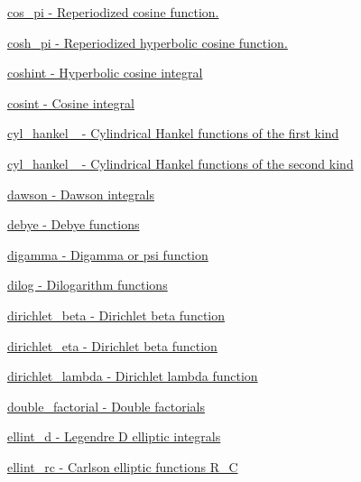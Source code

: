\begin{DoxyItemize}
\item \hyperlink{group__gnu__math__spec__func_gafc4698ae591b0e9e61285b0794d43ef4}{cos\+\_\+pi -\/ Reperiodized cosine function.}
\item \hyperlink{group__gnu__math__spec__func_gaf59c68a01adfdab0f22c4fb405ab2a36}{cosh\+\_\+pi -\/ Reperiodized hyperbolic cosine function.}
\item \hyperlink{group__gnu__math__spec__func_ga2411d513d418180285ace6650c7b7e31}{coshint -\/ Hyperbolic cosine integral}
\item \hyperlink{group__gnu__math__spec__func_gafd398869cde057087e6b3428a1d13a93}{cosint -\/ Cosine integral}
\item \hyperlink{group__gnu__math__spec__func_ga5329bba77d10a9d2f15d9bbe43a70db3}{cyl\+\_\+hankel\+\_ -\/ Cylindrical Hankel functions of the first kind}
\item \hyperlink{group__gnu__math__spec__func_ga7ebc71dd48ac97255d72f5f5f43dfd8e}{cyl\+\_\+hankel\+\_ -\/ Cylindrical Hankel functions of the second kind}
\item \hyperlink{group__gnu__math__spec__func_gabc97cbc04fdd23593e8dccbc1421dad5}{dawson -\/ Dawson integrals}
\item \hyperlink{group__gnu__math__spec__func_ga0b14de47c011de3ebf771c9f29b2b78c}{debye -\/ Debye functions}
\item \hyperlink{group__gnu__math__spec__func_ga7b87300edf8754d959e1d94fe0c9246e}{digamma -\/ Digamma or psi function}
\item \hyperlink{group__gnu__math__spec__func_ga4185ee1a0f9189a18085f65d52b6bc9b}{dilog -\/ Dilogarithm functions}
\item \hyperlink{group__gnu__math__spec__func_ga87466a2d429a2815d794acc21c882b08}{dirichlet\+\_\+beta -\/ Dirichlet beta function}
\item \hyperlink{group__gnu__math__spec__func_gae46e26e4107675d285c79a2d6202e6c7}{dirichlet\+\_\+eta -\/ Dirichlet beta function}
\item \hyperlink{group__gnu__math__spec__func_ga06842a81bdcabf9c62252dde992d42ee}{dirichlet\+\_\+lambda -\/ Dirichlet lambda function}
\item \hyperlink{group__gnu__math__spec__func_ga1e62c47f84f9782828f8830b4fedc13c}{double\+\_\+factorial -\/ Double factorials}
\item \hyperlink{group__gnu__math__spec__func_gad75103894786e6d7766bac4d8447b6cc}{ellint\+\_\+d -\/ Legendre D elliptic integrals}
\item \hyperlink{group__gnu__math__spec__func_ga7d3d42f5f71a74266be8aaca528056bf}{ellint\+\_\+rc -\/ Carlson elliptic functions R\+\_\+C}

\end{DoxyItemize}
